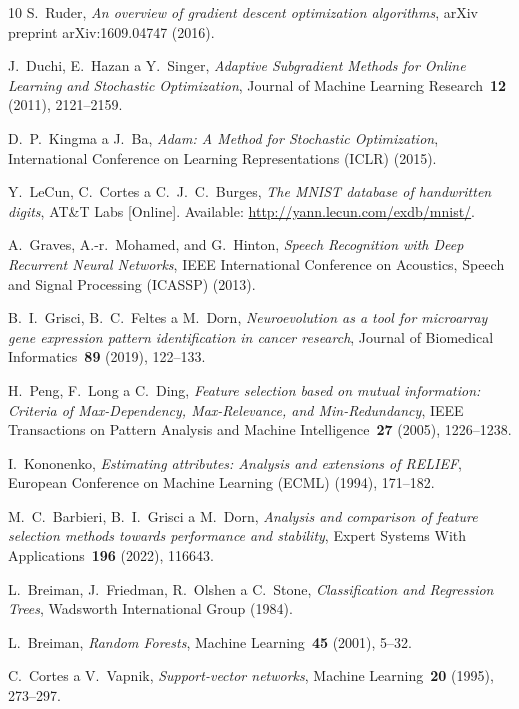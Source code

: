 \begin{thebibliography}{10}
S.~Ruder, \textit{An overview of gradient descent optimization algorithms}, 
arXiv preprint arXiv:1609.04747 (2016).

J.~Duchi, E.~Hazan a Y.~Singer, \textit{Adaptive Subgradient Methods for Online Learning and Stochastic Optimization}, 
Journal of Machine Learning Research~\textbf{12} (2011), 2121--2159.

D.~P.~Kingma a J.~Ba, \textit{Adam: A Method for Stochastic Optimization}, 
International Conference on Learning Representations (ICLR) (2015).

Y.~LeCun, C.~Cortes a C.~J.~C.~Burges, \textit{The MNIST database of handwritten digits}, 
AT\&T Labs [Online]. Available: \url{http://yann.lecun.com/exdb/mnist/}.
 
A.~Graves, A.-r.~Mohamed, and G.~Hinton, \textit{Speech Recognition with Deep Recurrent Neural Networks}, IEEE International Conference on Acoustics, Speech and Signal Processing (ICASSP) (2013).

B.~I.~Grisci, B.~C.~Feltes a M.~Dorn, \textit{Neuroevolution as a tool for microarray gene expression pattern identification in cancer research}, 
Journal of Biomedical Informatics~\textbf{89} (2019), 122--133.

H.~Peng, F.~Long a C.~Ding, \textit{Feature selection based on mutual information: Criteria of Max-Dependency, Max-Relevance, and Min-Redundancy}, 
IEEE Transactions on Pattern Analysis and Machine Intelligence~\textbf{27} (2005), 1226--1238.

I.~Kononenko, \textit{Estimating attributes: Analysis and extensions of RELIEF}, 
European Conference on Machine Learning (ECML) (1994), 171--182.

M.~C.~Barbieri, B.~I.~Grisci a M.~Dorn, \textit{Analysis and comparison of feature selection methods towards performance and stability}, 
Expert Systems With Applications~\textbf{196} (2022), 116643.

L.~Breiman, J.~Friedman, R.~Olshen a C.~Stone, \textit{Classification and Regression Trees}, 
Wadsworth International Group (1984).

L.~Breiman, \textit{Random Forests}, 
Machine Learning~\textbf{45} (2001), 5--32.

C.~Cortes a V.~Vapnik, \textit{Support-vector networks}, 
Machine Learning~\textbf{20} (1995), 273--297.


\end{thebibliography}
